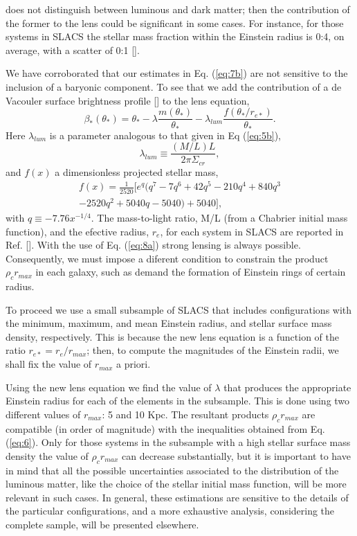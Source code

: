 \documentclass{article}
\begin{document}
\begin{multicols}{2}
does not distinguish between luminous and dark matter;
then the contribution of the former to the lens could be
significant in some cases. For instance, for those systems
in SLACS the stellar mass fraction within the Einstein
radius is 0:4, on average, with a scatter of 0:1 [\cite{21}].\par
We have corroborated that our estimates in Eq. (\ref{eq:7b}) are
not sensitive to the inclusion of a baryonic component.
To see that we add the contribution of a de Vacouler
surface brightness profile [\cite{22}] to the lens equation,
\begin{equation} \label{eq:8a}
\beta_*(\theta_*)=\theta_*-\lambda \frac{m(\theta_*)}{\theta_*}-\lambda_{lum}\frac{f(\theta_*/r_{e*})}{\theta_*}.
\end{equation}
Here $\lambda_{lum}$ is a parameter analogous to that given in
Eq (\ref{eq:5b}),
\begin{equation} \label{eq:8b}
\lambda_{lum}\equiv \frac{(M/L)L}{2\pi \Sigma_{cr}},
\end{equation}
and $f(x)$ a dimensionless projected stellar mass,
\begin{multline}
f(x)=\frac{1}{2520}[e^q(q^7-7q^6+42q^5-210q^4+840q^3\\-2520q^2+5040q-5040)+5040],
\end{multline}
with $q\equiv -7.76x^{-1/4}$. The mass-to-light ratio, M/L
(from a Chabrier initial mass function), and the efective
radius, $r_e$, for each system in SLACS are reported
in Ref. [\cite{21}]. With the use of Eq. (\ref{eq:8a}) strong lensing is always
possible. Consequently, we must impose a diferent
condition to constrain the product $\rho_cr_{max}$ in each galaxy,
such as demand the formation of Einstein rings of certain
radius.\par
To proceed we use a small subsample of SLACS that includes
configurations with the minimum, maximum, and
mean Einstein radius, and stellar surface mass density,
respectively. This is because the new lens equation is a
function of the ratio $r_{e*}=r_e/r_{max}$; then, to compute the
magnitudes of the Einstein radii, we shall fix the value of
$r_{max}$ a priori.\par
Using the new lens equation we find the value of $\lambda$ that
produces the appropriate Einstein radius for each of the
elements in the subsample. This is done using two different
values of $r_{max}$: 5 and 10 Kpc. The resultant products
$\rho_cr_{max}$ are compatible (in order of magnitude) with the
inequalities obtained from Eq. (\ref{eq:6}). Only for those systems
in the subsample with a high stellar surface mass
density the value of $\rho_cr_{max}$ can decrease substantially,
but it is important to have in mind that all the possible
uncertainties associated to the distribution of the luminous
matter, like the choice of the stellar initial mass
function, will be more relevant in such cases. In general,
these estimations are sensitive to the details of the
particular configurations, and a more exhaustive analysis,
considering the complete sample, will be presented
elsewhere.
\end{multicols}
\end{document}
